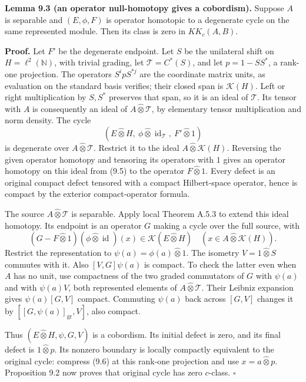 \documentclass[
  11pt,
]{article}
\begin{document}
\textbf{Lemma 9.3 (an operator null-homotopy gives a cobordism).}
Suppose \(A\) is separable and \((E,\phi,F)\) is operator homotopic to a
degenerate cycle on the same represented module. Then its class is zero
in \(KK_c(A,B)\).

\textbf{Proof.} Let \(F'\) be the degenerate endpoint. Let \(S\) be the
unilateral shift on \(H=\ell^2(\mathbb N)\), with trivial grading, let
\(\mathcal T=C^*(S)\), and let \(p=1-SS^*\), a rank-one projection. The
operators \(S^i p S^{*j}\) are the coordinate matrix units, as
evaluation on the standard basis verifies; their closed span is
\(\mathcal K(H)\). Left or right multiplication by \(S,S^*\) preserves
that span, so it is an ideal of \(\mathcal T\). Its tensor with \(A\) is
consequently an ideal of \(A\widehat\otimes\mathcal T\), by elementary
tensor multiplication and norm density. The cycle \[
(E\widehat\otimes H,\ \phi\widehat\otimes\operatorname{id}_{\mathcal T},\
F'\widehat\otimes1)
\tag{9.5}
\] is degenerate over \(A\widehat\otimes\mathcal T\). Restrict it to the
ideal \(A\widehat\otimes\mathcal K(H)\). Reversing the given operator
homotopy and tensoring its operators with \(1\) gives an operator
homotopy on this ideal from (9.5) to the operator \(F\widehat\otimes1\).
Every defect is an original compact defect tensored with a compact
Hilbert-space operator, hence is compact by the exterior
compact-operator formula.

The source \(A\widehat\otimes\mathcal T\) is separable. Apply local
Theorem A.5.3 to extend this ideal homotopy. Its endpoint is an operator
\(G\) making a cycle over the full source, with \[
(G-F\widehat\otimes1)(\phi\widehat\otimes\operatorname{id})(x)
\in\mathcal K(E\widehat\otimes H)
\quad(x\in A\widehat\otimes\mathcal K(H)).
\tag{9.6}
\] Restrict the representation to \(\psi(a)=\phi(a)\widehat\otimes1\).
The isometry \(V=1\widehat\otimes S\) commutes with it. Also
\([V,G]\psi(a)\) is compact. To check the latter even when \(A\) has no
unit, use compactness of the two graded commutators of \(G\) with
\(\psi(a)\) and with \(\psi(a)V\), both represented elements of
\(A\widehat\otimes\mathcal T\). Their Leibniz expansion gives
\(\psi(a)[G,V]\) compact. Commuting \(\psi(a)\) back across \([G,V]\)
changes it by \([[G,\psi(a)]_{\mathrm{gr}},V]\), also compact.

Thus \((E\widehat\otimes H,\psi,G,V)\) is a cobordism. Its initial
defect is zero, and its final defect is \(1\widehat\otimes p\). Its
nonzero boundary is locally compactly equivalent to the original cycle:
compress (9.6) at this rank-one projection and use
\(x=a\widehat\otimes p\). Proposition 9.2 now proves that original cycle
has zero \(c\)-class. \(\square\)
\end{document}
